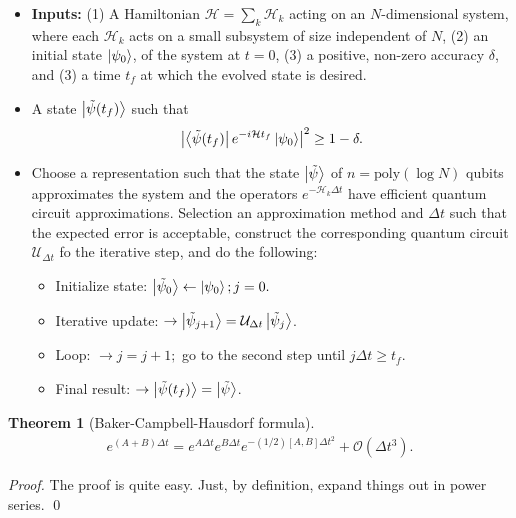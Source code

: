 \documentclass{book}
\theoremstyle{definition}
\newtheorem{thm}{Theorem}[section]
\newcommand{\had}{\mathcal{H}}
\newcommand{\U}{\mathcal{U}}
\begin{document}
\begin{itemize}
	\item \textbf{Inputs:} (1) A Hamiltonian $\had = \sum_k \had_k$ acting on an $N$-dimensional system, where each $\had_k$ acts on a small subsystem of size independent of $N$, (2) an initial state $\ket{\psi_0}$, of the system at $t=0$, (3) a positive, non-zero accuracy $\delta$, and (3) a time $t_f$ at which the evolved state is desired. 
	
	
	\item A state $\ket{\tilde{\psi}(t_f)}$ such that
	\begin{align}
	\abs{\bra{\tilde\psi (t_f)} e^{-i \had t_f} \ket{\psi_0}}^2 \geq 1 - \delta.
	\end{align}
	
	
	\item Choose a representation such that the state $\ket{\tilde\psi}$ of $n = \mbox{poly}(\log N)$ qubits approximates the system and the operators $e^{- \had_k \Delta t}$ have efficient quantum circuit approximations. Selection an approximation method and $\Delta t$ such that the expected error is acceptable, construct the corresponding quantum circuit $\U_{\Delta t}$ fo the iterative step, and do the following:
	\begin{itemize}
		\item Initialize state: $\ket{\tilde \psi_0} \leftarrow \ket{\psi_0}; j = 0.$ 
		\item Iterative update: $\to \ket{\tilde \psi_{j+1}} = \U_{\Delta t}\ket{\tilde \psi_j}$.
		\item Loop: $\to j = j+1;$ go to the second step until $j\Delta t \geq t_f$.
		
		\item Final result: $\to \ket{\tilde \psi(t_f)} = \ket{\tilde \psi}$.
	\end{itemize}
\end{itemize}


\begin{thm}[Baker-Campbell-Hausdorf formula]
	\begin{align}
	e^{(A+B)\Delta t} = e^{A \Delta t}e^{B \Delta t}e^{-(1/2)[A,B]\Delta t^2} + \mathcal{O}(\Delta t^3). 
	\end{align}
\end{thm}


\begin{proof}
	The proof is quite easy. Just, by definition, expand things out in power series. \qed
\end{proof}
\end{document}
